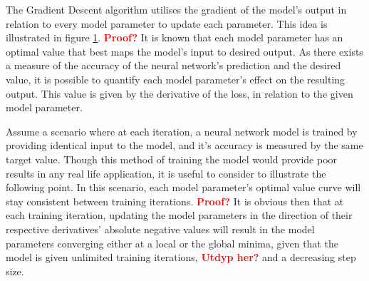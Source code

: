 \begin{figure}
    \centering
    \qquad
    \caption{}%
    \label{fig:parameter_gradient}%
\end{figure}

The Gradient Descent algorithm utilises the gradient of the model's output in relation to every model parameter
to update each parameter. This idea is illustrated in figure \ref{fig:parameter_gradient}. 
\textcolor{red}{\textbf{Proof?}} It is known that each model parameter has an optimal value that best maps the model's input to desired output.
As there exists a measure of the accuracy of the neural network's prediction and the desired value, 
it is possible to quantify each model parameter's effect on the resulting output. 
This value is given by the derivative of the loss, in relation to the given model parameter.

Assume a scenario where at each iteration, a neural network model is trained by providing identical input to the model, 
and it's accuracy is measured by the same target value. Though this method of training the model would provide poor results in any real life application,
it is useful to consider to illustrate the following point. In this scenario, each model parameter's optimal value curve will stay consistent between training iterations.
\textcolor{red}{\textbf{Proof?}} It is obvious then that at each training iteration, 
updating the model parameters in the direction of their respective derivatives' absolute negative values
will result in the model parameters converging either at a local or the global minima,
given that the model is given unlimited training iterations, \textcolor{red}{\textbf{Utdyp her?}} and a decreasing step size.

